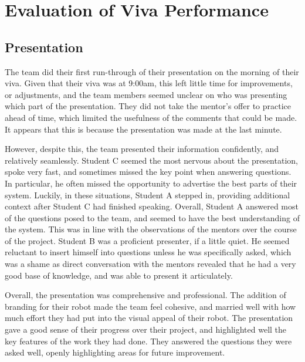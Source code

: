 


\section{Evaluation of Viva Performance}\label{sec:viva}
    \subsection{Presentation}\label{subsec:viva-presentation}
        The team did their first run-through of their presentation on the morning of their viva.
        Given that their viva was at 9:00am, this left little time for improvements, or adjustments, and the team members seemed unclear on who was presenting which part of the presentation.
        They did not take the mentor's offer to practice ahead of time, which limited the usefulness of the comments that could be made.
        It appears that this is because the presentation was made at the last minute.

        However, despite this, the team presented their information confidently, and relatively seamlessly.
        Student C seemed the most nervous about the presentation, spoke very fast, and sometimes missed the key point when answering questions.
        In particular, he often missed the opportunity to advertise the best parts of their system.
        Luckily, in these situations, Student A stepped in, providing additional context after Student C had finished speaking.
        Overall, Student A answered most of the questions posed to the team, and seemed to have the best understanding of the system.
        This was in line with the observations of the mentors over the course of the project.
        Student B was a proficient presenter, if a little quiet.
        He seemed reluctant to insert himself into questions unless he was specifically asked, which was a shame as direct conversation with the mentors revealed that he had a very good base of knowledge, and was able to present it articulately.

        Overall, the presentation was comprehensive and professional.
        The addition of branding for their robot made the team feel cohesive, and married well with how much effort they had put into the visual appeal of their robot.
        The presentation gave a good sense of their progress over their project, and highlighted well the key features of the work they had done.
        They answered the questions they were asked well, openly highlighting areas for future improvement.

